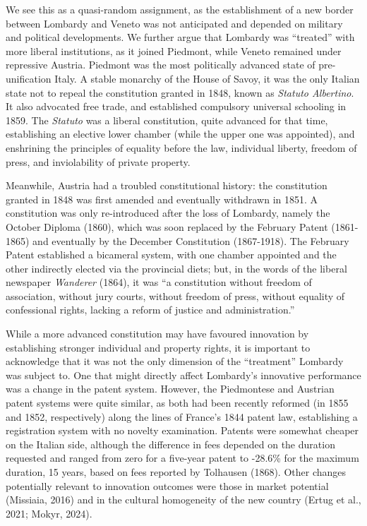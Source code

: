 We see this as a quasi-random assignment, as the establishment of a new border between Lombardy and Veneto was not anticipated and depended on military and political developments. We further argue that Lombardy was ``treated'' with more liberal institutions, as it joined Piedmont, while Veneto remained under repressive Austria. Piedmont was the most politically advanced state of pre-unification Italy. A stable monarchy of the House of Savoy, it was the only Italian state not to repeal the constitution granted in 1848, known as \textit{Statuto Albertino}. It also advocated free trade, and established compulsory universal schooling in 1859. The \textit{Statuto} was a liberal constitution, quite advanced for that time, establishing an elective lower chamber (while the upper one was appointed), and enshrining the principles of equality before the law, individual liberty, freedom of press, and inviolability of private property.

Meanwhile, Austria had a troubled constitutional history: the %
constitution granted in 1848 was first amended and eventually withdrawn in 1851. A constitution was only re-introduced after the loss of Lombardy, namely the October Diploma (1860), which was soon replaced by the February Patent (1861-1865) and eventually by the December Constitution (1867-1918). The February Patent established a bicameral system, with one chamber appointed and the other indirectly elected via the provincial diets; %
but, in the words of the liberal newspaper \textit{Wanderer} (1864), it was ``a constitution without freedom of association, without jury courts, without freedom of press, without equality of confessional rights, lacking a reform of justice and administration.”

While a more advanced constitution may have favoured innovation by establishing stronger individual and property rights, it is important to acknowledge that it was not the only dimension of the ``treatment'' Lombardy was subject to. One that might directly affect Lombardy's innovative performance was a change in the patent system. However, the Piedmontese and Austrian patent systems were quite similar, as both had been recently reformed (in 1855 and 1852, respectively) along the lines of France's 1844 patent law, establishing a registration system with no novelty examination. Patents were somewhat cheaper on the Italian side, although the difference in fees depended on the duration requested and ranged from zero for a five-year patent to -28.6\% for the maximum duration, 15 years, based on fees reported by Tolhausen (1868). 
Other changes potentially relevant to innovation outcomes were those in market potential (Missiaia, 2016) %
and in the cultural homogeneity of the new country (Ertug et al., 2021; Mokyr, 2024). %


